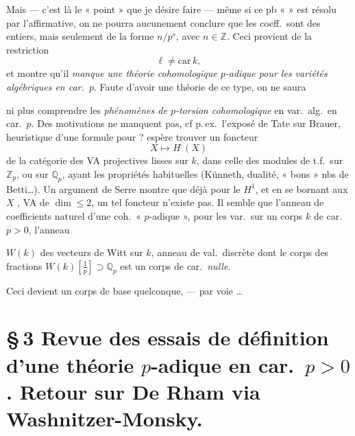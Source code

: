 \documentclass[11pt,a4paper]{article}
\begin{document}
Mais --- c'est là le « point » que je désire faire --- même si ce pb
« \ill{} »  est résolu par l'affirmative, on ne
pourra aucunement conclure que les coeff.\ sont des entiers, mais
seulement   de la forme $n/p^{s}$, avec $n \in \mathbb{Z}$.
Ceci provient de la restriction
\[
  \ell \neq \mathrm{car}\, k ,
\]
et montre qu'il \emph{manque une théorie cohomologique $p$-adique pour les
variétés algébriques en car.\ $p$}. Faute d'avoir une théorie de ce type,
on ne saura


ni plus comprendre les \emph{phénomènes de $p$-torsion cohomologique} en
var.\ alg.\ en car.\ $p$. Des \struck{\ill{}} motivations  ne manquent pas, cf
p.\,ex.\ l'exposé de Tate sur Brauer, \struck{\ill{}}   heuristique d'une formule pour
?  \add{\ill{} \ill{}} espère trouver un foncteur
\[
  X \longmapsto H^{\cdot}(X)
\]
de la catégorie des VA projectives lisses sur $k$, dans celle des modules
de t.f.\ sur $\mathbb{Z}_p$, ou sur $\mathbb{Q}_p$, ayant les propriétés
habituelles  (Künneth, dualité, « bons » nbs de Betti\ldots). Un
argument de Serre montre que déjà pour le $H^{1}$, et en se bornant aux
$X$ ,  VA de
$\dim \leq 2$, un tel foncteur n'existe pas. Il semble que l'anneau de
coefficients naturel d'une coh.\ « $p$-adique », pour les var.\ sur un
corps $k$ de car.\ $p > 0$, \struck{\ill{}} \ill{} l'anneau


$W(k)$ des vecteurs de Witt sur $k$, anneau de val.\ discrète dont le corps
des fractions $W(k)[\frac{1}{p}] \supset \mathbb{Q}_p$ est un corps de
car.\ \emph{nulle}.

Ceci devient  \ill{} \ill{} \ill{} \ill{} un corps de base
 quelconque, --- par voie  \ill{}\ldots

\section*{§\,3 Revue des essais de définition d'une théorie
 $p$-adique en car.\ $p > 0$. Retour sur De Rham via
Washnitzer-Monsky. }
\end{document}

